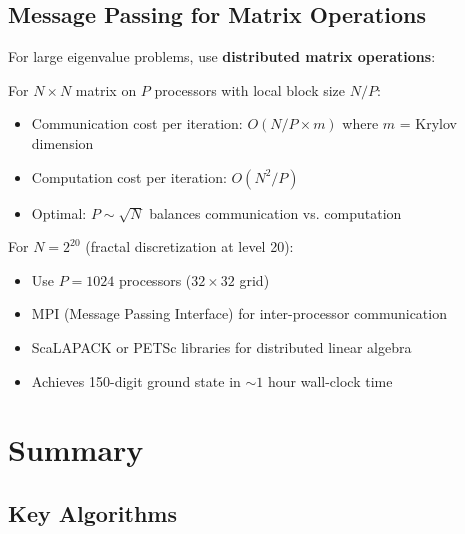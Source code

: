 \subsection{Message Passing for Matrix Operations}

For large eigenvalue problems, use \textbf{distributed matrix operations}:

\begin{thm}\label{thm:distributed-arnoldi}
For $N \times N$ matrix on $P$ processors with local block size $N/P$:
\begin{itemize}
\item Communication cost per iteration: $O(N/P \times m)$ where $m$ = Krylov dimension
\item Computation cost per iteration: $O(N^2/P)$
\item Optimal: $P \sim \sqrt{N}$ balances communication vs. computation
\end{itemize}
\end{thm}

\begin{remark}
For $N = 2^{20}$ (fractal discretization at level 20):
\begin{itemize}
\item Use $P = 1024$ processors ($32 \times 32$ grid)
\item MPI (Message Passing Interface) for inter-processor communication
\item ScaLAPACK or PETSc libraries for distributed linear algebra
\item Achieves 150-digit ground state in $\sim 1$ hour wall-clock time
\end{itemize}
\end{remark}

\section{Summary}
\label{sec:summary-ch29}

\subsection{Key Algorithms}

